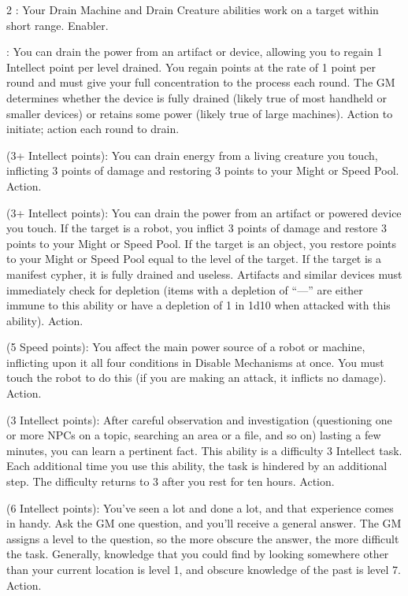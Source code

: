 \begin{multicols}{2}
: Your Drain Machine and Drain Creature abilities work on a target within short range. Enabler. 
 
: You can drain the power from an artifact or device, allowing you to regain 1 Intellect point per level drained. You regain points at the rate of 1 point per round and must give your full concentration to the process each round. The GM determines whether the device is fully drained (likely true of most handheld or smaller devices) or retains some power (likely true of large machines). Action to initiate; action each round to drain. 
 
 (3+ Intellect points): You can drain energy from a living creature you touch, inflicting 3 points of damage and restoring 3 points to your Might or Speed Pool. Action.
 
 (3+ Intellect points): You can drain the power from an artifact or powered device you touch. If the target is a robot, you inflict 3 points of damage and restore 3 points to your Might or Speed Pool. If the target is an object, you restore points to your Might or Speed Pool equal to the level of the target. If the target is a manifest cypher, it is fully drained and useless. Artifacts and similar devices must immediately check for depletion (items with a depletion of “—” are either immune to this ability or have a depletion of 1 in 1d10 when attacked with this ability). Action. 
 
 (5 Speed points): You affect the main power source of a robot or machine, inflicting upon it all four conditions in Disable Mechanisms at once. You must touch the robot to do this (if you are making an attack, it inflicts no damage). Action. 
 
 (3 Intellect points): After careful observation and investigation (questioning one or more NPCs on a topic, searching an area or a file, and so on) lasting a few minutes, you can learn a pertinent fact. This ability is a difficulty 3 Intellect task. Each additional time you use this ability, the task is hindered by an additional step. The difficulty returns to 3 after you rest for ten hours. Action. 
 
 (6 Intellect points): You’ve seen a lot and done a lot, and that experience comes in handy. Ask the GM one question, and you’ll receive a general answer. The GM assigns a level to the question, so the more obscure the answer, the more difficult the task. Generally, knowledge that you could find by looking somewhere other than your current location is level 1, and obscure knowledge of the past is level 7. Action. 


\end{multicols}

